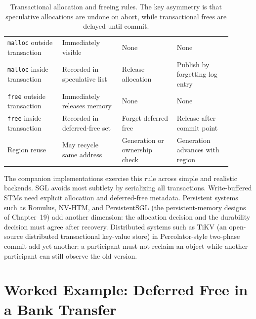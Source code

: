\begin{table}[htbp]
\centering
 \begin{tabular}{|M{0.22\linewidth}|M{0.24\linewidth}|M{0.22\linewidth}|M{0.22\linewidth}|}
\hline
{} &  &  &  \\
\hline
\texttt{malloc} outside transaction &
Immediately visible &
None &
None \\
\hline
\texttt{malloc} inside transaction &
Recorded in speculative list &
Release allocation &
Publish by forgetting log entry \\
\hline
\texttt{free} outside transaction &
Immediately releases memory &
None &
None \\
\hline
\texttt{free} inside transaction &
Recorded in deferred-free set &
Forget deferred free &
Release after commit point \\
\hline
Region reuse &
May recycle same address &
Generation or ownership check &
Generation advances with region \\
\hline
\end{tabular}
\caption{Transactional allocation and freeing rules.  The key asymmetry is that speculative allocations are undone on abort, while transactional frees are delayed until commit.}
\label{tab:tx-memory-rules}
\end{table}

The companion implementations exercise this rule across simple and realistic backends.  SGL avoids most subtlety by serializing all transactions.  Write-buffered STMs need explicit allocation and deferred-free metadata.  Persistent systems such as Romulus, NV-HTM, and PersistentSGL (the persistent-memory designs of Chapter~19) add another dimension: the allocation decision and the durability decision must agree after recovery.  Distributed systems such as TiKV (an open-source distributed transactional key-value store) in Percolator-style two-phase commit add yet another: a participant must not reclaim an object while another participant can still observe the old version.

\section{Worked Example: Deferred Free in a Bank Transfer}
\label{sec:deferred-free-bank-example}

